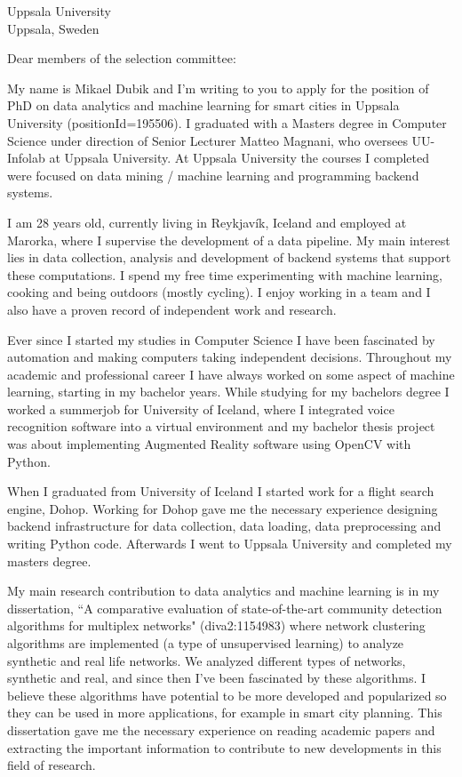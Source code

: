 \documentclass{letter}
\begin{document}
\begin{letter}{Uppsala University \\ Uppsala, Sweden}
\vspace*{-10\baselineskip}

\opening{Dear members of the selection committee:}
My name is Mikael Dubik and I'm writing to you to apply for the position of PhD on data analytics and machine learning for smart cities in Uppsala University (positionId=195506). I graduated with a Masters degree in Computer Science under direction of Senior Lecturer Matteo Magnani, who oversees UU-Infolab at Uppsala University. At Uppsala University the courses I completed were focused on data mining / machine learning and programming backend systems. 

I am 28 years old, currently living in Reykjavík, Iceland and employed at Marorka, where I supervise the development of a data pipeline. My main interest lies in data collection, analysis and development of backend systems that support these computations. I spend my free time experimenting with machine learning, cooking and being outdoors (mostly cycling). I enjoy working in a team and I also have a proven record of independent work and research.

Ever since I started my studies in Computer Science I have been fascinated by automation and making computers taking independent decisions. Throughout my academic and professional career I have always worked on some aspect of machine learning, starting in my bachelor years. While studying for my bachelors degree I worked a summerjob for University of Iceland, where I integrated voice recognition software into a virtual environment and my bachelor thesis project was about implementing Augmented Reality software using OpenCV with Python. 

When I graduated from University of Iceland I started work for a flight search engine, Dohop. Working for Dohop gave me the necessary experience designing backend infrastructure for data collection, data loading, data preprocessing and writing Python code. Afterwards I went to Uppsala University and completed my masters degree.

My main research contribution to data analytics and machine learning is in my dissertation, ``A comparative evaluation of state-of-the-art community detection algorithms for multiplex networks" (diva2:1154983) where network clustering algorithms are implemented (a type of unsupervised learning) to analyze synthetic and real life networks. We analyzed different types of networks, synthetic and real, and since then I've been fascinated by these algorithms. I believe these algorithms have potential to be more developed and popularized so they can be used in more applications, for example in smart city planning. This dissertation gave me the necessary experience on reading academic papers and extracting the important information to contribute to new developments in this field of research. 


\end{letter}
\end{document}
